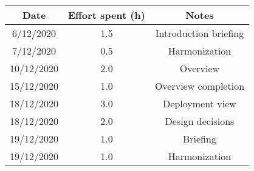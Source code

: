\documentclass[../../main.tex]{subfiles}
\begin{document}
    \begin{center}
        \begin{tabular}{|c| |c| |c|} 
            \hline
            Date & Effort spent (h) & Notes\\ [0.5ex] 
            \hline\hline
            6/12/2020 & 1.5 & Introduction briefing\\ 
            7/12/2020 & 0.5 & Harmonization\\
            10/12/2020 & 2.0 & Overview\\
            15/12/2020 & 1.0 & Overview completion\\
            18/12/2020 & 3.0 & Deployment view\\
            18/12/2020 & 2.0 & Design decisions\\
            19/12/2020 & 1.0 & Briefing\\
            19/12/2020 & 1.0 & Harmonization\\
            \hline
        \end{tabular}
    \end{center}
\end{document}

